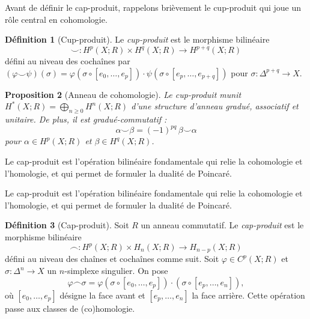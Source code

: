 \documentclass[12pt,a4paper,openany]{book}
\theoremstyle{definition}
\newtheorem{definition}{Définition}[chapter]
\theoremstyle{plain}
\newtheorem{proposition}[definition]{Proposition}
\theoremstyle{remark}
\begin{document}
Avant de définir le cap-produit, rappelons brièvement le cup-produit qui joue un
rôle central en cohomologie.

\begin{definition}[Cup-produit]\label{def:cup-produit}
  Le \emph{cup-produit} est le morphisme bilinéaire
  \[
    \smile \colon H^p(X; R) \times H^q(X; R) \longrightarrow H^{p+q}(X; R)
  \]
  défini au niveau des cochaînes par
  $(\varphi \smile \psi)(\sigma) = \varphi(\sigma \circ [e_0, \ldots, e_p])
  \cdot \psi(\sigma \circ [e_p, \ldots, e_{p+q}])$
  pour $\sigma \colon \Delta^{p+q} \to X$.
\end{definition}

\begin{proposition}[Anneau de cohomologie]\label{prop:anneau-cohomologie}
  Le cup-produit munit $H^*(X; R) = \bigoplus_{n \geq 0} H^n(X; R)$ d'une
  structure d'anneau gradué, associatif et unitaire. De plus, il est
  \emph{gradué-commutatif} :
  \[
    \alpha \smile \beta = (-1)^{pq} \, \beta \smile \alpha
  \]
  pour $\alpha \in H^p(X; R)$ et $\beta \in H^q(X; R)$.
\end{proposition}


Le cap-produit est l'opération bilinéaire fondamentale qui relie la cohomologie
et l'homologie, et qui permet de formuler la dualité de Poincaré.

Le cap-produit est l'opération bilinéaire fondamentale qui relie la cohomologie
et l'homologie, et qui permet de formuler la dualité de Poincaré.

\begin{definition}[Cap-produit]\label{def:cap-produit}
  Soit $R$ un anneau commutatif. Le \emph{cap-produit} est le morphisme bilinéaire
  \[
    \frown \colon H^p(X; R) \times H_n(X; R) \longrightarrow H_{n-p}(X; R)
  \]
  défini au niveau des chaînes et cochaînes comme suit. Soit
  $\varphi \in C^p(X; R)$ et $\sigma \colon \Delta^n \to X$ un $n$-simplexe
  singulier. On pose
  \[
    \varphi \frown \sigma = \varphi(\sigma \circ [e_0, \ldots, e_p]) \cdot
    (\sigma \circ [e_p, \ldots, e_n]),
  \]
  où $[e_0, \ldots, e_p]$ désigne la face avant et $[e_p, \ldots, e_n]$ la face
  arrière. Cette opération passe aux classes de (co)homologie.
\end{definition}
\end{document}
